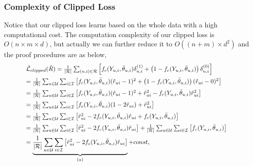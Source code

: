 \documentclass[sigconf]{acmart}
\begin{document}
\subsubsection{Complexity of Clipped Loss}
Notice that our clipped loss learns based on the whole data with a high computational cost. The computation complexity of our clipped loss is  $O(n \times m \times d)$, but actually we can further reduce it to $O\left((n + m )\times d^2\right)$ and the proof procedures are as below,
\begin{equation}\label{eq:complexityProof}
\begin{aligned}
& \resizebox{!}{.9\height}{$\hat{\mathcal{L}}_{clipped}(\hat{R}) = \frac{1}{|\mathcal{R}|} \sum_{(u, i) \in \mathcal{R}}^{} \left[f_{c}({Y_{u,i}}, {\bar{\theta}_{u,i}}) \delta_{u, i}^{(1)} +\left(1 - f_{c}({Y_{u,i}}, {\bar{\theta}_{u,i}})\right)\delta_{u, i}^{(0)} \right] $}\\
& \resizebox{!}{.9\height}{$= \frac{1}{|\mathcal{R}|} \sum_{u \in \mathcal{U}}^{} \sum_{i \in \mathcal{I}}^{} \left[f_{c}({Y_{u,i}}, {\bar{\theta}_{u,i}}) (\hat{r}_{ui} - 1)^2 +\left(1 - f_{c}({Y_{u,i}}, {\bar{\theta}_{u,i}})\right)(\hat{r}_{ui} - 0)^2 \right]$} \\
&\resizebox{!}{.9\height}{$ = \frac{1}{|\mathcal{R}|} \sum_{u \in \mathcal{U}}^{} \sum_{i \in \mathcal{I}}^{} \left[ f_{c}({Y_{u,i}}, {\bar{\theta}_{u,i}}) (\hat{r}_{ui} - 1)^2 + {\hat{r}_{ui}}^2 - f_{c}({Y_{u,i}}, {\bar{\theta}_{u,i}}){\hat{r}_{ui}}^2  \right] $}	 \\
&\resizebox{!}{.9\height}{$= \frac{1}{|\mathcal{R}|} \sum_{u \in \mathcal{U}}^{} \sum_{i \in \mathcal{I}}^{} \left[ f_{c}({Y_{u,i}}, {\bar{\theta}_{u,i}}) (1-2{\hat{r}_{ui}}) + {\hat{r}_{ui}}^2 \right]$} \\
&\resizebox{!}{.9\height}{$= \frac{1}{|\mathcal{R}|} \sum_{u \in \mathcal{U}}^{} \sum_{i \in \mathcal{I}}^{} \left[ {\hat{r}_{ui}}^2-2f_{c}({Y_{u,i}}, {\bar{\theta}_{u,i}}) {\hat{r}_{ui}}  + f_{c}({Y_{u,i}}, {\bar{\theta}_{u,i}}) \right] $}\\ 
&\resizebox{!}{.9\height}{$= \frac{1}{|\mathcal{R}|} \sum_{u \in \mathcal{U}}^{} \sum_{i \in \mathcal{I}}^{} \left[ {\hat{r}_{ui}}^2 - 2f_{c}({Y_{u,i}}, {\bar{\theta}_{u,i}}) {\hat{r}_{ui}}  \right] + \frac{1}{|\mathcal{R}|} \sum_{u \in \mathcal{U}}^{} \sum_{i \in \mathcal{I}}^{} \left[  f_{c}({Y_{u,i}}, {\bar{\theta}_{u,i}}) \right]$} \\ 
&\resizebox{!}{.9\height}{$= \underbrace {\frac{1}{|\mathcal{R}|} \sum_{u \in \mathcal{U}}^{} \sum_{i \in \mathcal{I}}^{} \left[ {\hat{r}_{ui}}^2 - 2f_{c}({Y_{u,i}}, {\bar{\theta}_{u,i}}) {\hat{r}_{ui}}  \right]}_{(a)} + const$},
\end{aligned}
\end{equation}
\end{document}
